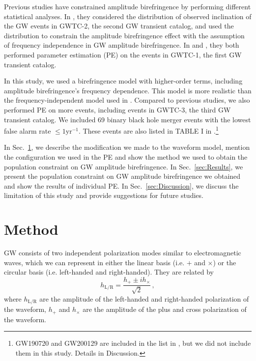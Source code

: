 \documentclass[aps,prd,twocolumn,superscriptaddress,preprintnumbers,floatfix,nofootinbib]{revtex4-2}
\begin{document}
Previous studies have constrained amplitude birefringence by performing different statistical analyses.
In \citet{Okounkova_2022}, they considered the distribution of observed inclination of the GW events in GWTC-2, the second GW transient catalog, and used the distribution to constrain the amplitude birefringence effect with the assumption of frequency independence in GW amplitude birefringence.
In \citet{Yamada_2020} and \citet{Wang_2021}, they both performed parameter estimation (PE) on the events in GWTC-1, the first GW transient catalog.

In this study, we used a birefringence model with higher-order terms, including amplitude birefringence's frequency dependence.
This model is more realistic than the frequency-independent model used in \citet{Okounkova_2022}.
Compared to previous studies, we also performed PE on more events, including events in GWTC-3, the third GW transient catalog.
We included 69 binary black hole merger events with the lowest false alarm rate $\leq1\mathrm{yr^{-1}}$.
These events are also listed in TABLE I in \citet{GWTC_3_population}.\footnote{
GW190720 and GW200129 are included in the list in \citet{GWTC_3_population}, but we did not include them in this study.
Details in Discussion.}

In Sec.~\ref{sec:Method}, we describe the modification we made to the waveform model, mention the configuration we used in the PE and show the method we used to obtain the population constraint on GW amplitude birefringence.
In Sec.~\ref{sec:Results}, we present the population constraint on GW amplitude birefringence we obtained and show the results of individual PE.
In Sec.~\ref{sec:Discussion}, we discuss the limitation of this study and provide suggestions for future studies.

\section{Method}
\label{sec:Method}
GW consists of two independent polarization modes similar to electromagnetic waves, which we can represent in either the linear basis (i.e. $+$ and $\times$) or the circular basis (i.e. left-handed and right-handed).
They are related by
\begin{equation}
    h_{\mathrm{L/R}} = \frac{h_+ \pm i h_\times}{\sqrt{2}}\,,
\end{equation}
where $h_{\mathrm{L/R}}$ are the amplitude of the left-handed and right-handed polarization of the waveform, $h_+$ and $h_\times$ are the amplitude of the plus and cross polarization of the waveform.
\end{document}
